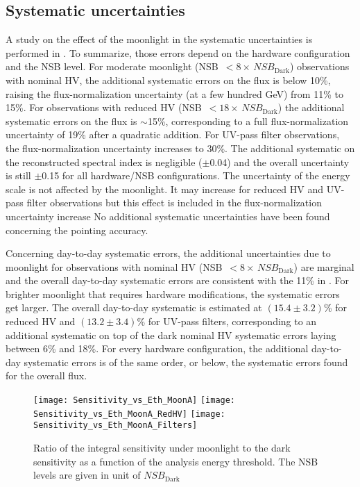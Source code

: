 \documentclass{PoS}
\begin{document}
\subsection*{Systematic uncertainties}

A study on the effect of the moonlight in the systematic uncertainties is performed in \cite{MAGIC_moon}. To summarize, those errors depend on the hardware configuration and the NSB level. For moderate moonlight (NSB~$<8 \times  \, \textit{NSB}_{\text{Dark}}$) observations with nominal HV, the additional systematic errors on the flux is below 10\%, raising the flux-normalization uncertainty (at a few hundred GeV) from 11\% \cite{upgrade2} to 15\%. For observations with reduced HV (NSB~$<18 \times  \, \textit{NSB}_{\text{Dark}}$) the additional systematic errors on the flux is $\sim$15\%, corresponding to a full flux-normalization uncertainty of 19\% after a quadratic addition. For UV-pass filter observations, the flux-normalization uncertainty increases to 30\%. The additional systematic on the reconstructed spectral index is negligible ($\pm$0.04) and the overall uncertainty is still $\pm$0.15 for all hardware/NSB configurations. The uncertainty of the energy scale is not affected by the moonlight. It may increase for reduced HV and UV-pass filter observations but this effect is included in the flux-normalization uncertainty increase
No additional systematic uncertainties have been found concerning the pointing accuracy.

Concerning day-to-day systematic errors, the additional uncertainties due to moonlight for observations with nominal HV (NSB~$<8 \times  \, \textit{NSB}_{\text{Dark}}$) are marginal and the overall day-to-day systematic errors are consistent with the 11\% in \cite{upgrade2}. For brighter moonlight that requires hardware modifications, the systematic errors get larger. The overall day-to-day systematic is estimated at $(15.4\pm3.2)$\% for reduced HV and $(13.2\pm3.4)$\% for UV-pass filters, corresponding to an additional systematic on top of the dark nominal HV systematic errors laying between 6\% and 18\%. For every hardware configuration, the additional day-to-day systematic errors is of the same order, or below, the systematic errors found for the overall flux.

\begin{figure}
\texttt{[image: Sensitivity\_vs\_Eth\_MoonA]}
\texttt{[image: Sensitivity\_vs\_Eth\_MoonA\_RedHV]}
\texttt{[image: Sensitivity\_vs\_Eth\_MoonA\_Filters]}
\caption{Ratio of the integral sensitivity under moonlight to the dark sensitivity as a function of the analysis energy threshold. The NSB levels are given in unit of $\textit{NSB}_{\text{Dark}}$}\label{fig:Sens}
\end{figure}
\end{document}
